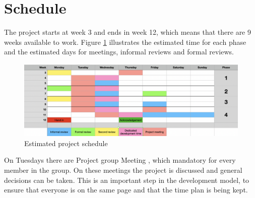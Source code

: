 \documentclass{article}
\begin{document}
\section{Schedule}
    The project starts at week 3 and ends in week 12, which means that
    there are 9 weeks available to work. Figure \ref{schedule} illustrates
    the estimated time for each phase and the estimated days for meetings,
    informal reviews and formal reviews.
    
    \begin{figure}[h]
        \centering
        \includegraphics[width=\textwidth]{images/schedule.png}
        \caption{Estimated project schedule}
        \label{schedule}
    \end{figure}
    
    On Tuesdays there are Project group Meeting \label{PM}, which mandatory for every member in the group.
    On these meetings the project is discussed and general decisions can be taken. This is an important
    step in the development model, to ensure that everyone is on the same page and that the time plan
    is being kept.
    
    
\end{document}
